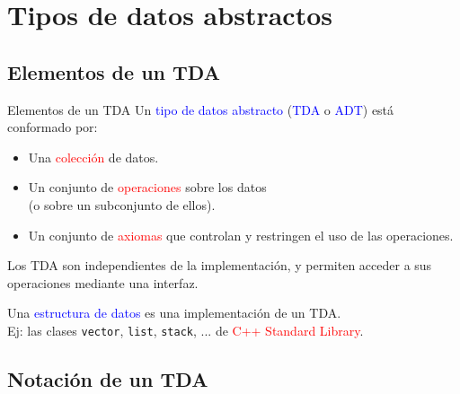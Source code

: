 \documentclass{beamer} %
\newcommand{\blue}[1]{\textcolor{blue}{#1}}
\newcommand{\red}[1]{\textcolor{red}{#1}}
\begin{document}

\section{Tipos de datos abstractos}

\subsection{Elementos de un TDA}

\begin{frame}{Elementos de un TDA}
    Un \blue{tipo de datos abstracto} (\blue{TDA} o \blue{ADT}) está conformado por:
    \begin{itemize}
        \item Una \red{colección} de datos.
        \item Un conjunto de \red{operaciones} sobre los datos\\
        (o sobre un subconjunto de ellos).
        \item Un conjunto de \red{axiomas} que controlan y restringen el uso de las operaciones.
    \end{itemize}
    \pause
    Los TDA son independientes de la implementación, y permiten acceder a sus operaciones mediante una interfaz.

    \pause
    Una \blue{estructura de datos} es una implementación de un TDA.\\
    Ej: las clases \texttt{vector}, \texttt{list}, \texttt{stack}, ... de \red{C++ Standard Library}.
\end{frame}

\subsection{Notación de un TDA}
\end{document}
